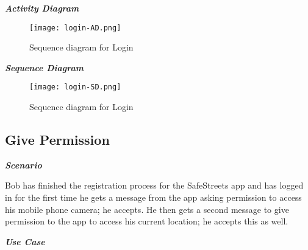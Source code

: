 \emph{\textbf{Activity Diagram}}

\begin{figure}[H]
\caption{Sequence diagram for Login}
\label{fig:SD-login}
\centering
\texttt{[image: login-AD.png]}
\end{figure}

\emph{\textbf{Sequence Diagram}}

\begin{figure}[H]
\caption{Sequence diagram for Login}
\label{fig:SD-login}
\centering
\texttt{[image: login-SD.png]}
\end{figure}

\subsection{Give Permission}

\emph{\textbf{Scenario}}

Bob has finished the registration process for the SafeStreets app and has logged in for the first time he gets a message from the app asking permission to access his mobile phone camera; he accepts. He then gets a second message to give permission to the app to access his current location; he accepts this as well.

\emph{\textbf{Use Case}}

